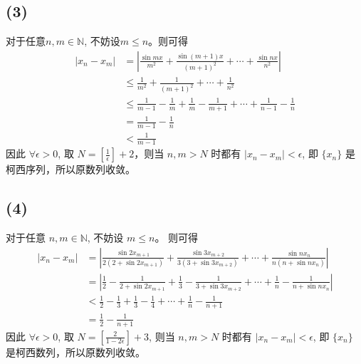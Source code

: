 \documentclass[a4paper,11pt]{article}
\begin{document}
\subsection*{(3)}
对于任意$n, m \in \mathbb{N}$, 不妨设$m \le n$。则可得
\begin{align*}
	|x_n-x_m| &= |\frac{\sin mx}{m^2} + \frac{\sin (m+1)x}{(m+1)^2} + \cdots + \frac{\sin nx}{n^2}|\\
					 &\le \frac{1}{m^2} + \frac{1}{(m+1)^2} + \cdots + \frac{1}{n^2}\\
				  	&\le \frac{1}{m - 1} - \frac{1}{m} + \frac{1}{m} - \frac{1}{m+1} + \cdots + \frac{1}{n-1} - \frac{1}{n}\\
				     &= \frac{1}{m-1} - \frac{1}{n}\\
				     &< \frac{1}{m-1}
\end{align*}
因此 $\forall \epsilon > 0$, 取 $N = [\frac{1}{\epsilon}] + 2$，则当 $n, m > N$ 时都有 $|x_n - x_m| < \epsilon$, 即 $\{x_n\}$ 是柯西序列，所以原数列收敛。
\subsection*{(4)}
对于任意 $n, m \in \mathbb{N}$, 不妨设 $m \le n $。 则可得
\begin{align*}
	|x_n - x_m| &= |\frac{\sin 2x_{m+1}}{2(2+\sin 2x_{m+1})} + \frac{\sin 3x_{m+2}}{3(3+\sin 3x_{m+2})} + \cdots + \frac{\sin nx_n}{n(n+\sin nx_n)}|\\
								&= |\frac{1}{2} - \frac{1}{2 + \sin 2x_{m+1}} + \frac{1}{3} - \frac{1}{3 + \sin 3x_{m+2}} + \cdots + \frac{1}{n} - \frac{1}{n + \sin nx_n}|\\
						     &< \frac{1}{2} - \frac{1}{3} + \frac{1}{3} - \frac{1}{4} + \cdots + \frac{1}{n} - \frac{1}{n + 1}\\
						     &= \frac{1}{2} - \frac{1}{n+1}
\end{align*}
因此 $\forall \epsilon > 0$, 取 $N = [\frac{2}{1-2\epsilon}] + 3$, 则当 $n, m > N$ 时都有 $|x_n - x_m| < \epsilon$, 即 $\{x_n\}$ 是柯西数列，所以原数列收敛。
\end{document}
